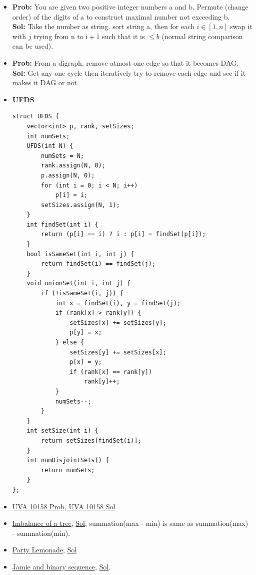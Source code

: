 \documentclass[8pt, a4paper, oneside, twocolumn]{extarticle}
\begin{document}
\begin{itemize}
    \item \textbf{Prob: }You are given two positive integer numbers a and b. Permute (change order) of the digits of a to construct maximal number not exceeding b.
    \\\textbf{Sol: }Take the number as string. sort string a, then for each $i \in [1, n]$ swap it with $j$ trying from $\text{n to i} + 1$ such that it is $\leq b$ (normal string comparison can be used).
    \item \textbf{Prob: }From a digraph, remove atmost one edge so that it becomes DAG.
    \\\textbf{Sol: }Get any one cycle then iteratively try to remove each edge and see if it makes it DAG or not.
    \item \textbf{UFDS}
    \begin{verbatim}
struct UFDS {
    vector<int> p, rank, setSizes;
    int numSets;
    UFDS(int N) {
        numSets = N;
        rank.assign(N, 0);
        p.assign(N, 0);
        for (int i = 0; i < N; i++)
            p[i] = i;
        setSizes.assign(N, 1);
    }
    int findSet(int i) {
        return (p[i] == i) ? i : p[i] = findSet(p[i]);
    }
    bool isSameSet(int i, int j) {
        return findSet(i) == findSet(j);
    }
    void unionSet(int i, int j) {
        if (!isSameSet(i, j)) {
            int x = findSet(i), y = findSet(j);
            if (rank[x] > rank[y]) {
                setSizes[x] += setSizes[y];
                p[y] = x;
            } else {
                setSizes[y] += setSizes[x];
                p[x] = y;
                if (rank[x] == rank[y])
                    rank[y]++;
            }
            numSets--;
        }
    }
    int setSize(int i) {
        return setSizes[findSet(i)];
    }
    int numDisjointSets() {
        return numSets;
    }
};
    \end{verbatim}
    \item \href {https://uva.onlinejudge.org/external/101/10158.pdf}{UVA 10158 Prob}, \href {https://gist.github.com/sourabh2311/3a2daf2a9f77104a94d1db9af8b40b1a}{UVA 10158 Sol}
    \item \href {https://codeforces.com/contest/915/problem/F}{Imbalance of a tree}, \href {https://github.com/sourabh2311/Competitive-Programming/blob/master/CF/ER36/F.cpp}{Sol}, summation(max - min) is same as summation(max) - summation(min).
    \item \href {https://codeforces.com/contest/913/problem/C}{Party Lemonade}, \href {https://codeforces.com/contest/913/submission/34067096}{Sol}
    \item \href {https://codeforces.com/contest/916/problem/B}{Jamie and binary sequence}, \href {https://github.com/sourabh2311/Competitive-Programming/blob/master/CF/457D2/B.cpp}{Sol}.

\end{itemize}
\end{document}
